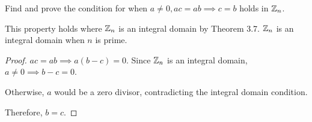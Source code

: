 \documentclass[../hw2]{subfiles}
\begin{document}
\begin{problem}[6]
Find and prove the condition for when $a\neq 0, ac=ab \implies c=b$ holds in $\mathbb{Z}_n$.
\end{problem}
\begin{proposition}
	This property holds where $\mathbb{Z}_n$ is an integral domain by Theorem 3.7.
	$\mathbb{Z}_n$ is an integral domain when $n$ is prime.
\end{proposition}
\begin{proof}
	$ac=ab\implies a(b-c)=0$.
	Since $\mathbb{Z}_n$ is an integral domain, $a\neq 0\implies b-c = 0$.

	Otherwise, $a$ would be a zero divisor, contradicting the integral domain condition.

	Therefore, $b=c$.
\end{proof}
\end{document}
